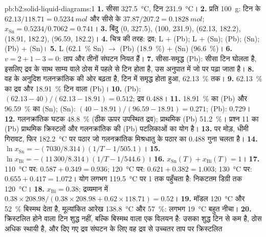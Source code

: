 \begin{solution}{pb:b2:solid-liquid-diagrams:1}
\textbf{1.} सीसा \qty{327.5}{\degreeCelsius}, टिन \qty{231.9}{\degreeCelsius}।
\textbf{2.} प्रति \qty{100}{g}: टिन के $62.13/118.71 = \qty{0.5234}{mol}$ और
सीसे के $37.87/207.2 = \qty{0.1828}{mol}$; $x_{\mathrm{Sn}} = 0.5234/0.7062 =
0.741$।
\textbf{3.} बिंदु (0, 327.5), (100, 231.9), (62.13, 182.2), (18.91, 182.2),
(96.59, 182.2)।
\textbf{4.} चित्र की तरह: द्रव; L + (Pb); L + (Sn); (Pb); (Sn); (Pb) + (Sn)।
\textbf{5.} L (62.1~\% Sn) $\longrightarrow$ (Pb) (18.9~\%) + (Sn) (96.6~\%)।
\textbf{6.} $v = 2 + 1 - 3 = 0$: ताप और तीनों संघटन
नियत हैं।
\textbf{7.} सीसा-समृद्ध  (Pb): सीसा टिन घोलता है, इसलिए द्रव के साथ
साम्य वाले ठोस में पहले से टिन होता है, उस अनुपात में जो
 पर पढ़ा जाता है।
\textbf{8.} वह  के अनुदिश गलनक्रांतिक की ओर बढ़ता है, टिन में समृद्ध होता हुआ,
62.13~\% तक।
\textbf{9.} 62.13~\% का द्रव और 18.91~\% टिन वाला (Pb)।
\textbf{10.} (Pb): $(62.13 - 40)/(62.13 - 18.91) = 0.512$; द्रव 0.488।
\textbf{11.} 18.91~\% का (Pb) और 96.59~\% का (Sn); (Sn): $(40 - 18.91)/(96.59 -
18.91) = 0.271$; (Pb): 0.729।
\textbf{12.} गलनक्रांतिक घटक 48.8~\% (ठीक ऊपर उपस्थित द्रव);
प्राथमिक (Pb) 51.2~\%। प्रश्न 11 का (Pb) प्राथमिक क्रिस्टलों और
गलनक्रांतिक की (Pb) पटलिकाओं का योग है।
\textbf{13.}  पर मोड़, धीमी गिरावट, फिर
\qty{182.2}{\degreeCelsius} पर पठार जो गलनक्रांतिक मिश्रधातु के पठार का 0.488 गुना चलता है।
\textbf{14.} $\ln x_{\mathrm{Sn}} = -(7030/8.314)(1/T - 1/505.1)$।
\textbf{15.} $\ln x_{\mathrm{Bi}} = -(11\,300/8.314)(1/T - 1/544.6)$।
\textbf{16.} $x_{\mathrm{Sn}}(T) + x_{\mathrm{Bi}}(T) = 1$।
\textbf{17.} \qty{110}{\degreeCelsius} पर: $0.587 + 0.349 = 0.936$;
\qty{120}{\degreeCelsius} पर: $0.621 + 0.382 = 1.003$;
\qty{130}{\degreeCelsius} पर: $0.655 + 0.417 = 1.072$। योग लगभग
\qty{119.5}{\degreeCelsius} पर 1 तक पहुँचता है: निकटतम डिग्री तक \qty{120}{\degreeCelsius}।
\textbf{18.} $x_{\mathrm{Bi}} = 0.38$; द्रव्यमान में $0.38 \times 208.98/(0.38 \times
208.98 + 0.62 \times 118.71) = 0.52$।
\textbf{19.} मॉडल \qty{120}{\degreeCelsius} और 52~\% बिस्मथ देता है,
मूल्यांकित आरेख \qty{138.8}{\degreeCelsius} और 57~\%: लगभग
\qty{19}{\degreeCelsius} बहुत नीचा।
\textbf{20.} क्रिस्टलित होने वाला टिन शुद्ध नहीं, बल्कि बिस्मथ वाला एक
विलयन है: उसका  शुद्ध टिन से कम है, ठोस
अधिक स्थायी है, और दिए गए द्रव संघटन के लिए वह द्रव से उच्चतर ताप पर क्रिस्टलित

\end{solution}
